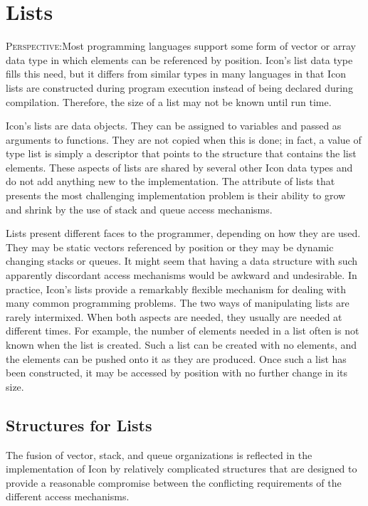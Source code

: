 \chapter{Lists}
\label{List-Chapter}
\textsc{Perspective}:Most programming languages support some form of
vector or array data type in which elements can be referenced by
position. Icon's list data type fills this need, but it differs from
similar types in many languages in that Icon lists are constructed
during program execution instead of being declared during
compilation. Therefore, the size of a list may not be known until run
time.

Icon's lists are data objects. They can be assigned to variables and
passed as arguments to functions. They are not copied when this is
done; in fact, a value of type list is simply a descriptor that points
to the structure that contains the list elements. These aspects of
lists are shared by several other Icon data types and do not add
anything new to the implementation. The attribute of lists that
presents the most challenging implementation problem is their ability
to grow and shrink by the use of stack and queue access mechanisms.

Lists present different faces to the programmer, depending on how they
are used. They may be static vectors referenced by position or they
may be dynamic changing stacks or queues. It might seem that having a
data structure with such apparently discordant access mechanisms would
be awkward and undesirable. In practice, Icon's lists provide a
remarkably flexible mechanism for dealing with many common programming
problems. The two ways of manipulating lists are rarely
intermixed. When both aspects are needed, they usually are needed at
different times. For example, the number of elements needed in a list
often is not known when the list is created. Such a list can be
created with no elements, and the elements can be pushed onto it as
they are produced. Once such a list has been constructed, it may be
accessed by position with no further change in its size.

\section{Structures for Lists}

The fusion of vector, stack, and queue organizations is reflected in
the implementation of Icon by relatively complicated structures that
are designed to provide a reasonable compromise between the
conflicting requirements of the different access mechanisms.


